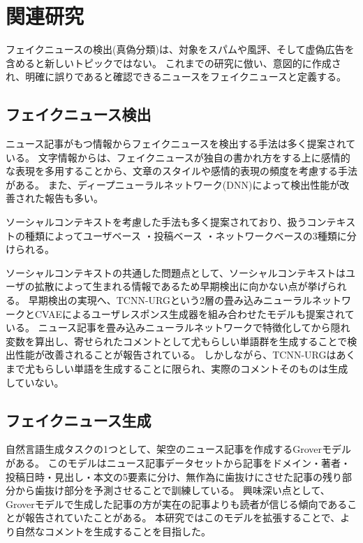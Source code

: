 \section{関連研究}
フェイクニュースの検出(真偽分類)は、対象をスパム\cite{shen2017discovering}や風評\cite{7023340}、そして虚偽広告\cite{Huang:2017:DFO:3041021.3054233}を含めると新しいトピックではない。
これまでの研究\cite{Shu:2017:FND:3137597.3137600,Ruchansky:2017:CHD:3132847.3132877,Wang:2018:EEA:3219819.3219903}に倣い、意図的に作成され、明確に誤りであると確認できるニュースをフェイクニュースと定義する。

\subsection{フェイクニュース検出}
ニュース記事がもつ情報からフェイクニュースを検出する手法は多く提案されている。
文字情報からは、フェイクニュースが独自の書かれ方をする上に感情的な表現を多用することから、文章のスタイル\cite{DBLP:journals/corr/PotthastKRBS17}や感情的表現の頻度\cite{DBLP:journals/corr/abs-1903-01728}を考慮する手法がある。
また、ディープニューラルネットワーク(DNN)によって検出性能が改善された報告\cite{wang-2017-liar,karimi-tang-2019-learning,karimi-etal-2018-multi}も多い。

ソーシャルコンテキストを考慮した手法も多く提案されており、扱うコンテキストの種類によってユーザベース\cite{Castillo:2011:ICT:1963405.1963500,8397048,DBLP:journals/corr/abs-1904-13355}
・投稿ベース\cite{Yang2019UnsupervisedFN,Tacchini2017SomeLI,Jin:2016:NVE:3016100.3016318}
・ネットワークベース\cite{Wu:2018:TFF:3159652.3159677,DBLP:journals/corr/abs-1902-06673}の3種類に分けられる。

ソーシャルコンテキストの共通した問題点として、ソーシャルコンテキストはユーザの拡散によって生まれる情報であるため早期検出に向かない点が挙げられる。
早期検出の実現へ、TCNN-URGという2層の畳み込みニューラルネットワークとCVAEによるユーザレスポンス生成器を組み合わせたモデルも提案されている\cite{ijcai2018-533}。
ニュース記事を畳み込みニューラルネットワークで特徴化してから隠れ変数を算出し、寄せられたコメントとして尤もらしい単語群を生成することで検出性能が改善されることが報告されている。
しかしながら、TCNN-URGはあくまで尤もらしい単語を生成することに限られ、実際のコメントそのものは生成していない。

\subsection{フェイクニュース生成}
\label{subsec:generate}
自然言語生成タスクの1つとして、架空のニュース記事を作成するGroverモデルがある\cite{NIPS2019_9106}。
このモデルはニュース記事データセットから記事をドメイン・著者・投稿日時・見出し・本文の5要素に分け、無作為に歯抜けにさせた記事の残り部分から歯抜け部分を予測させることで訓練している。
興味深い点として、Groverモデルで生成した記事の方が実在の記事よりも読者が信じる傾向であることが報告されていたことがある。
本研究ではこのモデルを拡張することで、より自然なコメントを生成することを目指した。
